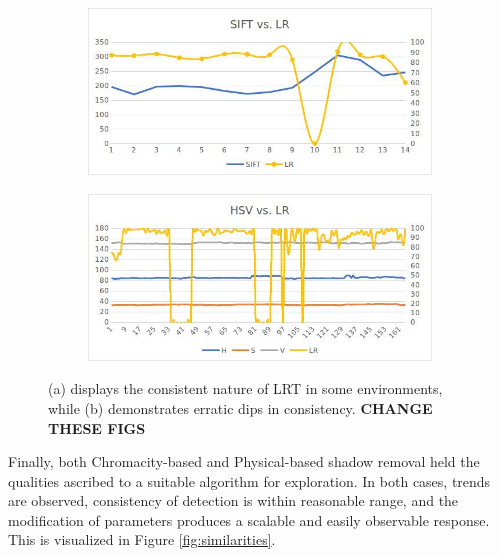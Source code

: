 \documentclass[12pt]{report}
\begin{document}
\begin{figure}
\centering
\begin{subfigure}{.8\linewidth}
  \centering
  \includegraphics[width=1\linewidth]{figures/lrt_sensitivity_2.jpg}
  \caption{}
  \label{fig:sub1}
\end{subfigure}
\hfill
\begin{subfigure}{.8\linewidth}
  \centering
  \includegraphics[width=1\linewidth]{figures/lrt_sensitivity_1.jpg}
  \caption{}
  \label{fig:sub2}
\end{subfigure}
\caption{(a) displays the consistent nature of LRT in some environments, while (b) demonstrates erratic dips in consistency. \textbf{CHANGE THESE FIGS}}
\label{fig:lrt_sensitivity}
\end{figure}

Finally, both Chromacity-based and Physical-based shadow removal held the qualities ascribed to a suitable algorithm for exploration. In both cases, trends are observed, consistency of detection is within reasonable range, and the modification of parameters produces a scalable and easily observable response. This is visualized in Figure \ref{fig:similarities}.
\end{document}
